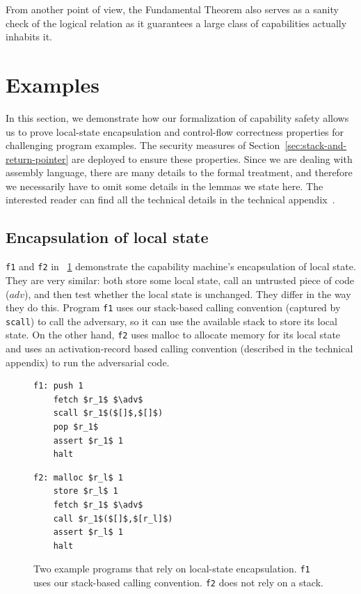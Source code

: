 \documentclass[compsoc,conference,letterpaper,fleqn]{IEEEtran}
\newcommand{\var}[1]{\mathit{#1}}
\newcommand{\adv}{\var{adv}}
\begin{document}
From another point of view, the Fundamental Theorem also serves as a sanity
check of the logical relation as it guarantees a large class of
capabilities actually inhabits it.

\section{Examples}
\label{sec:examples}
In this section, we demonstrate how our formalization of capability safety
allows us to prove local-state encapsulation and control-flow correctness
properties for challenging program examples. The security measures of
Section~\ref{sec:stack-and-return-pointer} are deployed to ensure these
properties. Since we are dealing with assembly language, there are many details
to the formal treatment, and therefore we necessarily have to omit some details
in the lemmas we state here. The interested reader can find all the technical
details in the technical appendix~\citep{technical_appendix}.

\subsection{Encapsulation of local state}
\texttt{\footnotesize{f1}} and \texttt{\footnotesize{f2}} in
\figurename~\ref{fig:prog-f1-and-f2} demonstrate the capability
machine's encapsulation of local state. They are very similar: both
store some local state, call an untrusted piece of code ($\adv$), and
then test whether the local state is unchanged. They differ in the way
they do this. Program \texttt{\footnotesize{f1}} uses our stack-based
calling convention (captured by \texttt{\footnotesize{scall}}) to call
the adversary, so it can use the available stack to store its local
state.  On the other hand, \texttt{\footnotesize{f2}} uses malloc to
allocate memory for its local state and uses an activation-record
based calling convention (described in the technical appendix) to run
the adversarial code.

\begin{figure}[t]
  \centering

  \begin{minipage}[t]{4.1cm}
  \begin{lstlisting}
f1: push 1
    fetch $r_1$ $\adv$
    scall $r_1$($[]$,$[]$)
    pop $r_1$
    assert $r_1$ 1
    halt
  \end{lstlisting}
  \end{minipage}
  \begin{minipage}[t]{4.1cm}
  \begin{lstlisting}
f2: malloc $r_l$ 1
    store $r_l$ 1
    fetch $r_1$ $\adv$
    call $r_1$($[]$,$[r_l]$)
    assert $r_l$ 1
    halt
  \end{lstlisting}
  \end{minipage}
  \caption{Two example programs that rely on local-state encapsulation. \texttt{f1} uses our stack-based calling convention. \texttt{f2} does not rely on a stack.}
  \label{fig:prog-f1-and-f2}
\end{figure}
\end{document}
